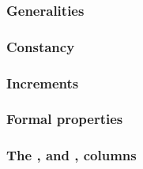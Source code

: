 \subsubsection{Generalities}                                                                 \label{hub: system: hub stamp: generalities}                 
\subsubsection{Constancy}                                                                    \label{hub: system: hub stamp: constancy}                    
\subsubsection{Increments}                                                                   \label{hub: system: hub stamp: increments}                   
\subsubsection{Formal properties}                                                            \label{hub: system: hub stamp: formal properties}            
\subsubsection{The \tli, \tliCounter{} and \nonStackRows, \nonStackRowsCounter{} columns}    \label{hub: system: hub stamp: counters}                     
